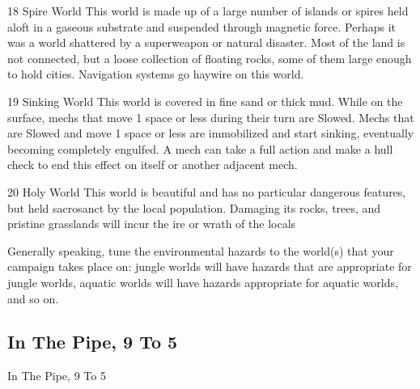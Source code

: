  18      Spire World                         This world is made up of a large number of islands or  
                                             spires held aloft in a gaseous substrate and suspended  
                                             through magnetic force. Perhaps it was a world  
                                             shattered by a superweapon or natural disaster. Most of  
                                             the land is not connected, but a loose collection of  
                                             floating rocks, some of them large enough to hold  
                                             cities. Navigation systems go haywire on this world. 

 19      Sinking World                       This world is covered in fine sand or thick mud. While  
                                             on the surface, mechs that move 1 space or less during  
                                             their turn are Slowed. Mechs that are Slowed and move  
                                             1 space or less are immobilized and start sinking,  
                                             eventually becoming completely engulfed. A mech can  
                                             take a full action and make a hull check to end this  
                                             effect on itself or another adjacent mech. 

 20      Holy World                          This world is beautiful and has no particular dangerous  
                                             features, but held sacrosanct by the local population.  
                                             Damaging its rocks, trees, and pristine grasslands will  
                                             incur the ire or wrath of the locals 

Generally speaking, tune the environmental hazards to the world(s) that your campaign takes  
place on: jungle worlds will have hazards that are appropriate for jungle worlds, aquatic worlds  
will have hazards appropriate for aquatic worlds, and so on. 
 

                                                                                                          
\subsection{In The Pipe, 9 To 5 }

In The Pipe, 9 To 5   

